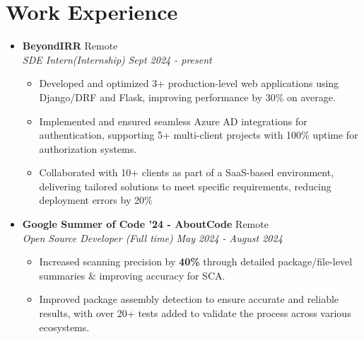 \documentclass[legalpaper,10.5pt]{article}
\begin{document}
\section{Work Experience}
\begin{itemize}[leftmargin=*]

\item \textbf{BeyondIRR}  \hfill {Remote} \\
\textit{SDE Intern(Internship)}  \hfill \textit{Sept 2024 - present}
\begin{itemize}[label=$\diamond$]
    \item Developed and optimized 3+ production-level web applications using Django/DRF and Flask, improving performance by 30\% on average.
    \item Implemented and ensured seamless Azure AD integrations for authentication, supporting 5+ multi-client projects with 100\% uptime for authorization systems.
    \item Collaborated with 10+ clients as part of a SaaS-based environment, delivering tailored solutions to meet specific requirements, reducing deployment errors by 20\%
\end{itemize}

\item \textbf{Google Summer of Code '24 - AboutCode}  \hfill {Remote} \\
\textit{Open Source Developer (Full time)}  \hfill \textit{May 2024 - August 2024}
\begin{itemize}[label=$\diamond$]
    \item \small Increased scanning precision by \textbf{40\%} through detailed package/file-level summaries \& improving accuracy for SCA.
    \item Improved package assembly detection to ensure accurate and reliable results, with over 20+ tests added to validate the process across various ecosystems.

\end{itemize}

\end{itemize}
\end{document}
